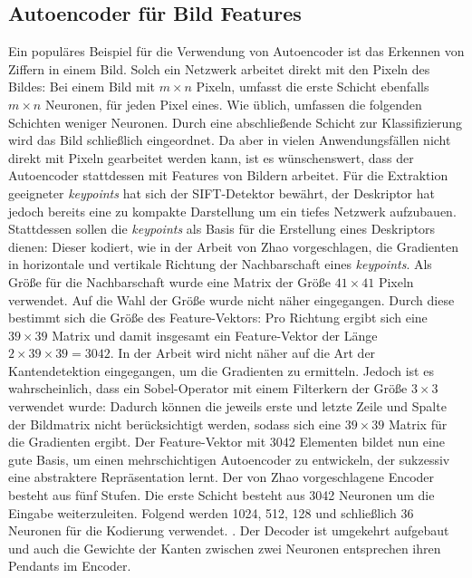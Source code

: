 \subsection{Autoencoder für Bild Features}

Ein populäres Beispiel für die Verwendung von Autoencoder ist das Erkennen von Ziffern in einem Bild. Solch ein Netzwerk arbeitet direkt mit den Pixeln des Bildes: Bei einem Bild mit $m \times n$ Pixeln, umfasst die erste Schicht ebenfalls $m \times n$ Neuronen, für jeden Pixel eines. Wie üblich, umfassen die folgenden Schichten weniger Neuronen. Durch eine abschließende Schicht zur Klassifizierung wird das Bild schließlich eingeordnet. Da aber in vielen Anwendungsfällen nicht direkt mit Pixeln gearbeitet werden kann, ist es wünschenswert, dass der Autoencoder stattdessen mit Features von Bildern arbeitet. Für die Extraktion geeigneter \textit{keypoints} hat sich der SIFT-Detektor bewährt, der Deskriptor hat jedoch bereits eine zu kompakte Darstellung um ein tiefes Netzwerk aufzubauen. Stattdessen sollen die \textit{keypoints} als Basis für die Erstellung eines Deskriptors dienen: Dieser kodiert, wie in der Arbeit von Zhao \cite{aed2016} vorgeschlagen, die Gradienten in horizontale und vertikale Richtung der Nachbarschaft eines \textit{keypoints}. Als Größe für die Nachbarschaft wurde eine Matrix der Größe $41 \times 41$ Pixeln verwendet. Auf die Wahl der Größe wurde nicht näher eingegangen. Durch diese bestimmt sich die Größe des Feature-Vektors: Pro Richtung ergibt sich eine $39 \times 39$ Matrix und damit insgesamt ein Feature-Vektor der Länge $2 \times 39 \times 39 = 3042$. In der Arbeit wird nicht näher auf die Art der Kantendetektion eingegangen, um die Gradienten zu ermitteln. Jedoch ist es wahrscheinlich, dass ein Sobel-Operator mit einem Filterkern der Größe $3 \times 3$ verwendet wurde: Dadurch können die jeweils erste und letzte Zeile und Spalte der Bildmatrix nicht berücksichtigt werden, sodass sich eine $39 \times 39$ Matrix für die Gradienten ergibt.
Der Feature-Vektor mit 3042 Elementen bildet nun eine gute Basis, um einen mehrschichtigen Autoencoder zu entwickeln, der sukzessiv eine abstraktere Repräsentation lernt. Der von Zhao vorgeschlagene Encoder besteht aus fünf Stufen. Die erste Schicht besteht aus 3042 Neuronen um die Eingabe weiterzuleiten. Folgend werden 1024, 512, 128 und schließlich 36 Neuronen für die Kodierung verwendet. . Der Decoder ist umgekehrt aufgebaut und auch die Gewichte der Kanten zwischen zwei Neuronen entsprechen ihren Pendants im Encoder.

